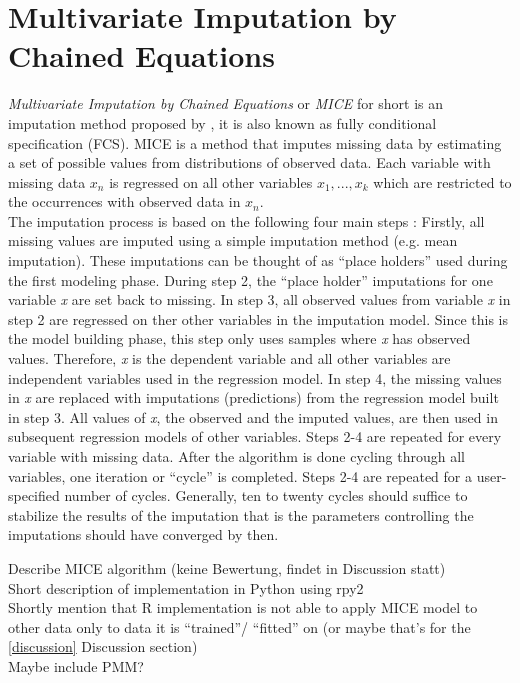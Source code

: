 \section{Multivariate Imputation by Chained Equations}
\textit{Multivariate Imputation by Chained Equations} or \textit{MICE} for 
short is an imputation method proposed by \citeauthor{RN135} \cite{RN135}, it 
is also known as fully conditional specification (FCS).
MICE is a method that imputes missing data by estimating a set of possible 
values from distributions of observed data. Each variable with missing data 
$x_n$ is regressed on all other variables $x_1, ..., x_k$ which are restricted 
to the occurrences with observed data in $x_n$.
\\
The imputation process is based on the following four main steps \cite{RN142, 
RN141}: Firstly, all missing values are imputed using a simple imputation 
method (e.g. mean imputation). These imputations can be thought of as ``place 
holders'' used during the first modeling phase. During step 2, the ``place 
holder'' imputations for one variable \textit{x} are set back to missing. In 
step 3, all observed values from variable \textit{x} in step 2 are regressed on 
ther other variables in the imputation model. Since this is the model building 
phase, this step only uses samples where \textit{x} has observed values. 
Therefore, \textit{x} is the dependent variable and all other variables are 
independent variables used in the regression model. In step 4, the missing 
values in \textit{x} are replaced with imputations (predictions) from the 
regression model built in step 3. All values of \textit{x}, the observed and the 
imputed values, are then used in subsequent regression models of other 
variables.
Steps 2-4 are repeated for every variable with missing data. After the 
algorithm is done cycling through all variables, one iteration or ``cycle'' is 
completed. Steps 2-4 are repeated for a user-specified number of cycles. 
Generally, ten to twenty cycles should suffice to stabilize the results of the 
imputation that is the parameters controlling the imputations should have 
converged by then.
\begin{changemargin}{50pt}{50pt}
Describe MICE algorithm (keine Bewertung, findet in Discussion statt)
\\
Short description of implementation in Python using rpy2
\\
Shortly mention that R implementation is not able to apply MICE model to other 
data only to data it is ``trained''/ ``fitted'' on (or maybe that's for the 
\ref{discussion} Discussion section)
\\
Maybe include PMM?
\end{changemargin}
